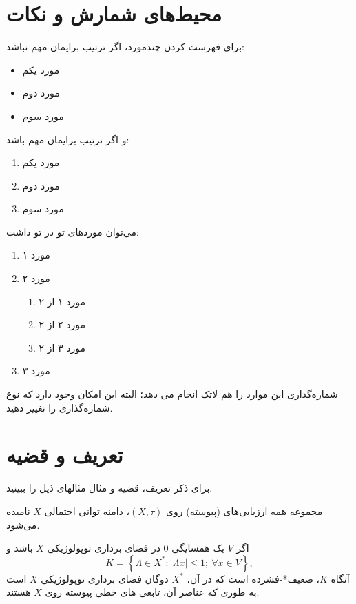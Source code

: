 \section{محیط‌های شمارش و نکات}
برای فهرست کردن چندمورد، اگر ترتیب برایمان مهم نباشد:
\begin{itemize}
    \item مورد یکم
    \item مورد دوم
    \item مورد سوم
\end{itemize}
و اگر ترتیب برایمان مهم باشد:
\begin{enumerate}
    \item مورد یکم
    \item مورد دوم
    \item مورد سوم
\end{enumerate}
می‌توان موردهای تو در تو داشت:
\begin{enumerate}
    \item مورد ۱
    \item مورد ۲
        \begin{enumerate}
            \item مورد ۱ از ۲
            \item مورد ۲ از ۲
            \item مورد ۳ از ۲
        \end{enumerate}
    \item مورد ۳
\end{enumerate}
شماره‌گذاری این موارد را هم لاتک انجام می دهد؛ البته این امکان وجود دارد که نوع شماره‌گذاری را تغییر دهید. 

\section{تعریف و قضیه}

برای ذکر تعریف، قضیه و مثال مثالهای ذیل را ببینید.

%
%
%

\begin{definition}
مجموعه همه ارزیابی‌های  (پیوسته)  روی $(X,\tau)$، دامنه توانی احتمالی
$ X $
نامیده می‌شود.
\end{definition}

\begin{theorem}
اگر $ V $ یک همسایگی $ 0 $ در فضای برداری 
 توپولوژیکی $ X $ باشد و 
\begin{equation}\label{eq1}
K=\left\lbrace \Lambda \in X^{*}:|\Lambda x|\leqslant 1 ; \ \forall x\in V\right\rbrace,
\end{equation}
آنگاه $ K $،  ضعیف*-فشرده است که در آن، $ X^{*} $ دوگان 
 فضای برداری توپولوژیکی $ X $ است به  طوری که عناصر آن،  تابعی های  خطی پیوسته  روی $X$ هستند.
\end{theorem}

